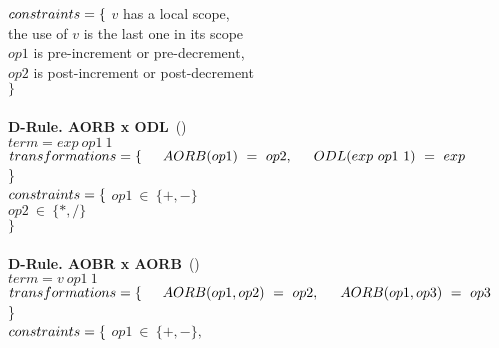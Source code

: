 $constraints = \{ \\$ 
\indent $v$ has a local scope, \\
\indent the use of $v$ is the last one in its scope \\
\indent $op1$ is pre-increment or pre-decrement, \\ 
\indent $op2$ is post-increment or post-decrement \\ 
$\}$
\\
\\
\textbf{D-Rule. AORB x ODL}~(\mujava{})\\
$term = exp~op1~1 $\\
$transformations = \{\\ \indent AORB(op1)~=~op2,\\ \indent ODL(exp~op1~1)~=~exp$\\\}\\
$constraints = \{ \\$ 
\indent $op1~\in~\{+, -\}$  \\
\indent $op2~\in~\{*, /\}$  \\ 
$\}$
\\
\\
\textbf{D-Rule. AOBR x AORB}~(\mujava{})\\
$term = v~op1~1 $\\
$transformations = \{\\ \indent AORB(op1, op2)~=~op2,\\ \indent AORB(op1, op3)~=~op3$\\\}\\
$constraints = \{ \\$ 
\indent $op1~\in~\{+, -\},  $\\
